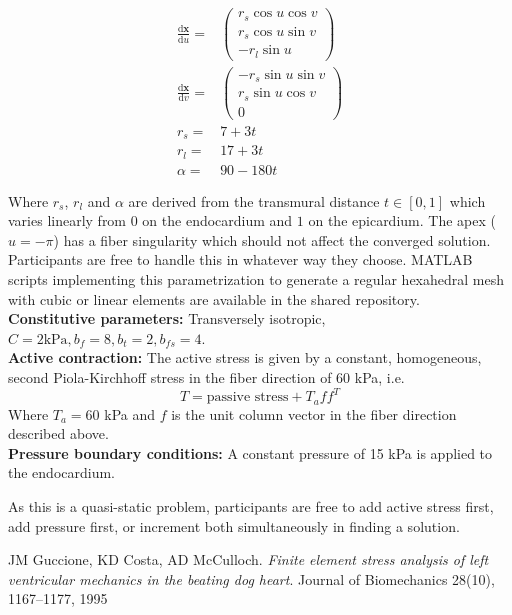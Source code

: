 \documentclass[a4paper,10pt]{article}
\begin{document}
\begin{align}
\frac{ \text{d}\mathbf{x} }{ \text{d}u } =& \left(\begin{array}{c} r_s \cos u \cos v \\ r_s \cos u \sin v \\  -r_l \sin u \end{array}\right)  \\
\frac{ \text{d}\mathbf{x} }{ \text{d}v } =& \left(\begin{array}{c} -r_s \sin u \sin v \\ r_s \sin u \cos v \\ 0  \end{array}\right)  \\
r_s    =&  7 + 3t\\
r_l    =& 17 + 3t\\
\alpha =& 90 - 180t
\end{align}

Where $r_s$, $r_l$ and $\alpha$ are derived from the transmural distance $t \in [0,1]$ which varies linearly from $0$ on the endocardium and $1$ on the epicardium.
The apex ($u=-\pi$) has a fiber singularity which should not affect the converged solution. Participants are free to handle this in whatever way they choose.
MATLAB scripts implementing this parametrization to generate a regular hexahedral mesh with cubic or linear elements are available in the shared repository.\\
\textbf{Constitutive parameters:} Transversely isotropic, $C=2 \text{kPa}, b_f=8, b_t=2, b_{fs}=4$.\\
\textbf{Active contraction:} 
  The active stress is given by a constant, homogeneous, second Piola-Kirchhoff stress in the fiber direction of 60 kPa, i.e.
\[
 T = \text{passive stress} + T_a f f^T
\]
Where $T_a=60$ kPa and $f$ is the unit column vector in the fiber direction described above.\\
\textbf{Pressure boundary conditions:}
 A constant pressure of 15 kPa is applied to the endocardium.

As this is a quasi-static problem, participants are free to add active stress first, add pressure first, or increment both simultaneously in finding a solution.
 
\begin{thebibliography}{99}

  JM Guccione, KD Costa, AD McCulloch.
  \emph{Finite element stress analysis of left ventricular mechanics in the beating dog heart}.
  Journal of Biomechanics 28(10), 1167--1177, 1995

  
\end{thebibliography}
\end{document}
